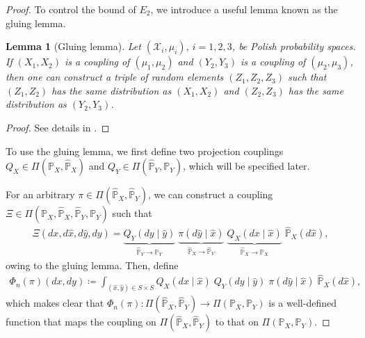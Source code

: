 \documentclass{article}
\newtheorem{lemma}{Lemma}
\DeclareMathOperator*{\argmin}{arg\,min}
\begin{document}
\begin{proof}
	To control the bound of $E_2$, we introduce a useful lemma known as the gluing lemma.
	\begin{lemma}[Gluing lemma]
		Let $(\mathcal{X}_i,\mu_i)$, $i=1,2,3$, be Polish probability spaces. If $(X_1,X_2)$ is a coupling of $(\mu_1,\mu_2)$ and $(Y_2,Y_3)$ is a coupling of $(\mu_2,\mu_3)$, then one can construct a triple of random elements $(Z_1,Z_2,Z_3)$ such that $(Z_1,Z_2)$ has the same distribution as $(X_1,X_2)$ and $(Z_2,Z_3)$ has the same distribution as $(Y_2,Y_3)$.
	\end{lemma}
	\begin{proof}
		See details in \cite{villani2008optimal}.
	\end{proof}
	To use the gluing lemma, we first define two projection couplings $Q_X \in \Pi(\mathbb{P}_X,\hat{\mathbb{P}}_X)$ and $Q_Y \in \Pi(\hat{\mathbb{P}}_Y,\mathbb{P}_Y)$, which will be specified later.
	
	For an arbitrary $\pi \in \Pi(\hat{\mathbb{P}}_X,\hat{\mathbb{P}}_Y)$, we can construct a coupling $\Xi \in \Pi(\mathbb{P}_X,\hat{\mathbb{P}}_X,\hat{\mathbb{P}}_Y,\mathbb{P}_Y)$ such that
	\begin{align}
		\label{eq:glued-coupling}
		\Xi(dx,d\hat{x},d\hat{y},dy) = \underbrace{Q_Y(dy \mid \hat{y})}_{\hat{\mathbb{P}}_Y \to \mathbb{P}_Y} \; \underbrace{\pi(d\hat{y} \mid \hat{x})}_{\hat{\mathbb{P}}_X \to \hat{\mathbb{P}}_Y} \; \underbrace{Q_X(dx \mid \hat{x})}_{\hat{\mathbb{P}}_X \to \mathbb{P}_X} \; \hat{\mathbb{P}}_X(d\hat{x}) ,
	\end{align}
	owing to the gluing lemma. Then, define
	\begin{align*}
		\Phi_n(\pi)(dx,dy) \coloneqq \int_{(\hat{x},\hat{y}) \in S \times S}  Q_X(dx \mid \hat{x}) \; Q_Y(dy \mid \hat{y}) \; \pi(d\hat{y} \mid \hat{x}) \; \hat{\mathbb{P}}_X(d\hat{x}) ,
	\end{align*}
	which makes clear that $\Phi_n(\pi) : \Pi(\hat{\mathbb{P}}_X,\hat{\mathbb{P}}_Y) \to \Pi(\mathbb{P}_X,\mathbb{P}_Y)$ is a well-defined function that maps the coupling on $\Pi(\hat{\mathbb{P}}_X,\hat{\mathbb{P}}_Y)$ to that on $\Pi(\mathbb{P}_X,\mathbb{P}_Y)$.
	

\end{proof}
\end{document}
